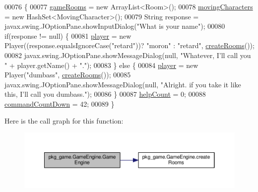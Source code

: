 \begin{DoxyCode}
00076                         \{
00077         \hyperlink{classpkg__game_1_1GameEngine_a4b4afca13ceeb1057e50471670bf3306}{gameRooms} = \textcolor{keyword}{new} ArrayList<Room>();
00078         \hyperlink{classpkg__game_1_1GameEngine_a64a7051b0ae6fb816d566be8ddbab3cb}{movingCharacters} = \textcolor{keyword}{new} HashSet<MovingCharacter>();
00079         String response = javax.swing.JOptionPane.showInputDialog(\textcolor{stringliteral}{"What is your name"});
00080         \textcolor{keywordflow}{if}(response != null) \{
00081             \hyperlink{classpkg__game_1_1GameEngine_a864d14b3375ad026e700ba0c0b9f9d2d}{player} = \textcolor{keyword}{new} Player((response.equalsIgnoreCase(\textcolor{stringliteral}{"retard"}))? \textcolor{stringliteral}{"moron"} : \textcolor{stringliteral}{"retard"}, 
      \hyperlink{classpkg__game_1_1GameEngine_a986180eff9d235e3b619c7403accfc31}{createRooms}());
00082             javax.swing.JOptionPane.showMessageDialog(null, \textcolor{stringliteral}{"Whatever, I'll call you "} + player.getName() +
       \textcolor{stringliteral}{"."});
00083         \} \textcolor{keywordflow}{else} \{
00084             \hyperlink{classpkg__game_1_1GameEngine_a864d14b3375ad026e700ba0c0b9f9d2d}{player} = \textcolor{keyword}{new} Player(\textcolor{stringliteral}{"dumbass"}, \hyperlink{classpkg__game_1_1GameEngine_a986180eff9d235e3b619c7403accfc31}{createRooms}());
00085             javax.swing.JOptionPane.showMessageDialog(null, \textcolor{stringliteral}{"Alright. if you take it like this, I'll call
       you dumbass."});
00086         \}
00087         \hyperlink{classpkg__game_1_1GameEngine_a3229e823376625b5d9102d24d628a0fb}{helpCount} = 0;
00088         \hyperlink{classpkg__game_1_1GameEngine_af4ea44f51563b4e2c0a67fe918bf5e3c}{commandCountDown} = 42;
00089     \}
\end{DoxyCode}


Here is the call graph for this function\-:
\nopagebreak
\begin{figure}[H]
\begin{center}
\leavevmode
\includegraphics[width=350pt]{classpkg__game_1_1GameEngine_a6b6494f73d268d0c394d819c8425f1d5_cgraph}
\end{center}
\end{figure}




